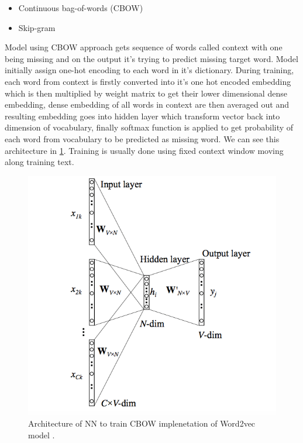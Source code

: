 \begin{itemize}
	\item Continuous bag-of-words (CBOW) 
	\item Skip-gram
\end{itemize}

Model using CBOW approach gets sequence of words called context with one being missing and on the output it's trying to predict missing target word. Model initially assign one-hot encoding to each word in it's dictionary. During training, each word from context is firstly converted into it's one hot encoded embedding which is then multiplied by weight matrix to get their lower dimensional dense embedding, dense embedding of all words in context are then averaged out and resulting embedding goes into hidden layer which transform vector back into dimension of vocabulary, finally softmax function is applied to get probability of each word from vocabulary to be predicted as missing word. We can see this architecture in \ref{fig:cbow_arch}. Training is usually done using fixed context window moving along training text.
\\


\begin{figure}[!h]
	\centering
	
	\includegraphics[width=1\textwidth]{images/CBOW_arch.png}
	
	\caption{Architecture of NN to train CBOW implenetation of Word2vec model \cite{cbow}.}
	\label{fig:cbow_arch}
\end{figure}


